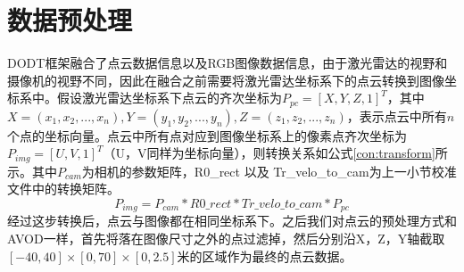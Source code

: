 


\section{数据预处理}
\label{preprocessing}
DODT框架融合了点云数据信息以及RGB图像数据信息，由于激光雷达的视野和摄像机的视野不同，因此在融合之前需要将激光雷达坐标系下的点云转换到图像坐标系中。假设激光雷达坐标系下点云的齐次坐标为$P_{pc}=[X,Y,Z,1]^T$，其中$X=(x_1,x_2,...,x_n),Y=(y_1,y_2,...,y_n),Z=(z_1,z_2,...,z_n)$，表示点云中所有$n$个点的坐标向量。点云中所有点对应到图像坐标系上的像素点齐次坐标为$P_{img} = [U,V,1]^T$（U，V同样为坐标向量），则转换关系如公式\ref{con:transform}所示。其中$P_{cam}$为相机的参数矩阵，R0\_rect 以及 Tr\_velo\_to\_cam为上一小节校准文件中的转换矩阵。
\begin{equation}
P_{img} = P_{cam} * R0\_rect * Tr\_velo\_to\_cam * P_{pc}
\label{con:transform}
\end{equation}
经过这步转换后，点云与图像都在相同坐标系下。之后我们对点云的预处理方式和AVOD\cite{ku2018joint}一样，首先将落在图像尺寸之外的点过滤掉，然后分别沿X，Z，Y轴截取$[-40,40] \times [0,70] \times [0,2.5]$米的区域作为最终的点云数据。

